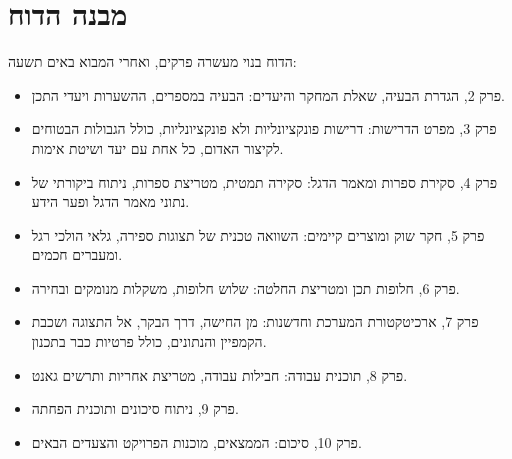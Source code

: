 \section{מבנה הדוח}
הדוח בנוי מעשרה פרקים, ואחרי המבוא באים תשעה:
\begin{itemize}
\item פרק \num{2}, הגדרת הבעיה, שאלת המחקר והיעדים: הבעיה במספרים, ההשערות ויעדי התכן.
\item פרק \num{3}, מפרט הדרישות: דרישות פונקציונליות ולא פונקציונליות, כולל הגבולות הבטוחים לקיצור האדום, כל אחת עם יעד ושיטת אימות.
\item פרק \num{4}, סקירת ספרות ומאמר הדגל: סקירה תמטית, מטריצת ספרות, ניתוח ביקורתי של נתוני מאמר הדגל ופער הידע.
\item פרק \num{5}, חקר שוק ומוצרים קיימים: השוואה טכנית של תצוגות ספירה, גלאי הולכי רגל ומעברים חכמים.
\item פרק \num{6}, חלופות תכן ומטריצת החלטה: שלוש חלופות, משקלות מנומקים ובחירה.
\item פרק \num{7}, ארכיטקטורת המערכת וחדשנות: מן החישה, דרך הבקר, אל התצוגה ושכבת הקמפיין והנתונים, כולל פרטיות כבר בתכנון.
\item פרק \num{8}, תוכנית עבודה: חבילות עבודה, מטריצת אחריות ותרשים גאנט.
\item פרק \num{9}, ניתוח סיכונים ותוכנית הפחתה.
\item פרק \num{10}, סיכום: הממצאים, מוכנות הפרויקט והצעדים הבאים.
\end{itemize}
